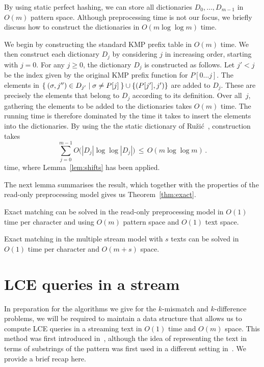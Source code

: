 \documentclass[envcountsame]{llncs}
\renewcommand{\geq}{\geqslant}
\renewcommand{\leq}{\leqslant}
\begin{document}
By using static perfect hashing, we can store all dictionaries $D_0,\dots,D_{m-1}$ in $O(m)$ pattern space. Although preprocessing time is not our focus, we briefly discuss how to construct the dictionaries in $O(m \log \log m)$ time.

We begin by constructing the standard KMP prefix table in $O(m)$ time. We then construct each dictionary $D_j$ by considering $j$ in increasing order, starting with $j=0$. For any $j\geq 0$, the dictionary $D_j$ is constructed as follows. Let $j'<j$ be the index given by the original KMP prefix function for $P[0 \ldots j]$. The elements in
$\Set{ (\sigma, j'') \in D_{j'} | \sigma \neq P[j] } \cup \{(P[j'], j')\}$ are added to $D_j$. These are precisely the elements that belong to $D_j$ according to its definition. Over all~$j$, gathering the elements to be added to the dictionaries takes $O(m)$ time. The running time is therefore dominated by the time it takes to insert the elements into the dictionaries. By using the the static dictionary of Ru\v{z}i\'{c}~\cite{Ruzic:08}, construction takes
\begin{equation*}
    \sum_{j=0}^{m-1} O\big(|D_j| \log{\log {|D_j|}}\big) \,\leq\, O(m \log\log m) \,.
\end{equation*}
time, where Lemma~\ref{lem:shifts} has been applied.

The next lemma summarises the result, which together with the properties of the read-only preprocessing model gives us Theorem~\ref{thm:exact}.

\begin{lemma}
    Exact matching can be solved in the read-only preprocessing model in $O(1)$ time per character and using $O(m)$ pattern space and $O(1)$ text space.
\end{lemma}

\begin{theorem}
    \label{thm:exact}
    Exact matching in the multiple stream model with $s$ texts can be solved in $O(1)$ time per character and $O(m+s)$ space.
\end{theorem}










\section{LCE queries in a stream}\label{sec:lce}

In preparation for the algorithms we give for the $k$-mismatch and
$k$-difference problems, we will be required to maintain a data
structure that allows us to
compute LCE queries in a streaming text in $O(1)$ time  and $O(m)$ space.  This method was first introduced
in~\cite{CS:2010}, although the idea of representing the text in terms of substrings of the pattern was first used in a different
setting in~\cite{ALLS:2007}. We provide a brief recap here.
\end{document}
